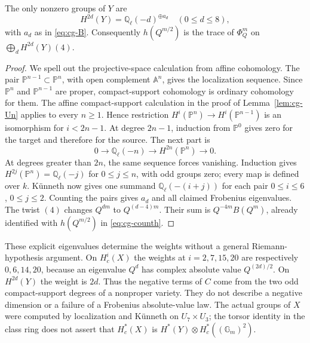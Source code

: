 \begin{proposition}\label{prop:cg-YFrob}
The only nonzero groups of $Y$ are
\[
 H^{2d}(Y)=\mathbb Q_\ell(-d)^{\oplus a_d}\quad(0\leq d\leq8),
\]
with $a_d$ as in \eqref{eq:cg-B}. Consequently $h(Q^{m/2})$ is the
trace of $\Phi_Q^m$ on $\bigoplus_dH^{2d}(Y)(4)$.
\end{proposition}
\begin{proof}
We spell out the projective-space calculation from affine cohomology.
The pair $\mathbb P^{n-1}\subset\mathbb P^n$, with open complement
$\mathbb A^n$, gives the localization sequence. Since $\mathbb P^n$
and $\mathbb P^{n-1}$ are proper, compact-support cohomology is ordinary
cohomology for them. The affine compact-support calculation in the proof
of Lemma~\ref{lem:cg-Un} applies to every $n\geq1$. Hence restriction
$H^i(\mathbb P^n)\to H^i(\mathbb P^{n-1})$ is an isomorphism for
$i<2n-1$. At degree $2n-1$, induction from $\mathbb P^0$ gives zero
for the target and therefore for the source. The next part is
\[
 0\longrightarrow\mathbb Q_\ell(-n)
 \longrightarrow H^{2n}(\mathbb P^n)\longrightarrow0.
\]
At degrees greater than $2n$, the same sequence forces vanishing.
Induction gives $H^{2j}(\mathbb P^n)=\mathbb Q_\ell(-j)$ for
$0\leq j\leq n$, with odd groups zero; every map is defined over $k$.
K\"unneth now gives one summand $\mathbb Q_\ell(-(i+j))$ for each
pair $0\leq i\leq6$, $0\leq j\leq2$. Counting the pairs gives
$a_d$ and all claimed Frobenius eigenvalues. The twist $(4)$ changes
$Q^{dm}$ to $Q^{(d-4)m}$. Their sum is $Q^{-4m}B(Q^m)$, already
identified with $h(Q^{m/2})$ in \eqref{eq:cg-counth}.
\end{proof}

\begin{remark}\label{rem:cg-weight}
These explicit eigenvalues determine the weights without a general
Riemann-hypothesis argument. On $H^i_c(X)$ the weights at
$i=2,7,15,20$ are respectively $0,6,14,20$, because an eigenvalue
$Q^d$ has complex absolute value $Q^{(2d)/2}$. On $H^{2d}(Y)$ the
weight is $2d$. Thus the negative terms of $C$ come from the two
odd compact-support degrees of a nonproper variety. They do not
describe a negative dimension or a failure of a Frobenius absolute-value
law. The actual groups of $X$ were computed by localization and
K\"unneth on $U_7\times U_3$; the torsor identity in the class ring
does not assert that $H^*_c(X)$ is $H^*(Y)\otimes H^*_c((\mathbb G_m)^2)$.
\end{remark}

